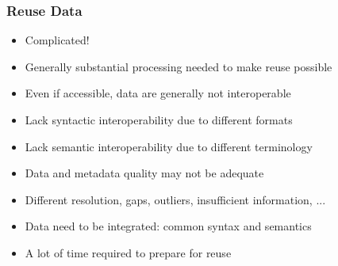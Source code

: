 \documentclass{beamer}
\begin{document}
{
	\begin{frame}[plain]
	\end{frame}
}

\begin{frame}
  \frametitle{Reuse Data}
  
  \begin{itemize}
  \item Complicated!
  \item Generally substantial processing needed to make reuse possible
  \item Even if accessible, data are generally not interoperable
  \item Lack syntactic interoperability due to different formats
  \item Lack semantic interoperability due to different terminology
  \item Data and metadata quality may not be adequate
  \item Different resolution, gaps, outliers, insufficient information, ...
  \item Data need to be integrated: common syntax and semantics
  \item A lot of time required to prepare for reuse
  \end{itemize}
\end{frame}
\end{document}
